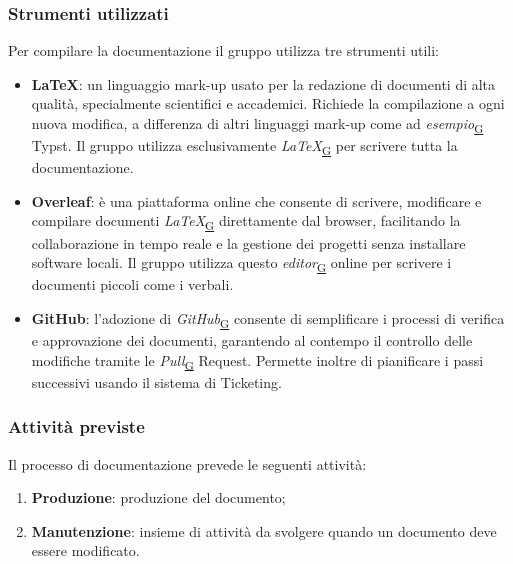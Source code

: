 \documentclass[a4paper,12pt]{article}
\begin{document}
    \subsubsection{Strumenti utilizzati}
        Per compilare la documentazione il gruppo utilizza tre strumenti utili:
        \begin{itemize}
            \item \textbf{LaTeX}: un linguaggio mark-up usato per la redazione di documenti di alta qualità, specialmente scientifici e accademici. Richiede la compilazione a ogni nuova modifica, a differenza di altri linguaggi mark-up come ad \textit{esempio}\textsubscript{\href{https://atlasteam9.github.io/Atlas/glossario.html\#Esempio}{G}} Typst. Il gruppo utilizza esclusivamente \textit{LaTeX}\textsubscript{\href{https://atlasteam9.github.io/Atlas/glossario.html\#LaTeX}{G}} per scrivere tutta la documentazione.
            \item \textbf{Overleaf}: è una piattaforma online che consente di scrivere, modificare e compilare documenti \textit{LaTeX}\textsubscript{\href{https://atlasteam9.github.io/Atlas/glossario.html\#LaTeX}{G}} direttamente dal browser, facilitando la collaborazione in tempo reale e la gestione dei progetti senza installare software locali. Il gruppo utilizza questo \textit{editor}\textsubscript{\href{https://atlasteam9.github.io/Atlas/glossario.html\#Editor}{G}} online per scrivere i documenti piccoli come i verbali.
            \item \textbf{GitHub}: l'adozione di \textit{GitHub}\textsubscript{\href{https://atlasteam9.github.io/Atlas/glossario.html\#GitHub}{G}} consente di semplificare i processi di verifica e approvazione dei documenti, garantendo al contempo il controllo delle modifiche tramite le \textit{Pull}\textsubscript{\href{https://atlasteam9.github.io/Atlas/glossario.html\#Pull}{G}} Request. Permette inoltre di pianificare i passi successivi usando il sistema di Ticketing.
        \end{itemize}

    \subsubsection{Attività previste}
        Il processo di documentazione prevede le seguenti attività:
        \begin{enumerate}
            \item \textbf{Produzione}: produzione del documento;
            \item \textbf{Manutenzione}: insieme di attività da svolgere quando un documento deve essere modificato.
        \end{enumerate}
        
\end{document}
